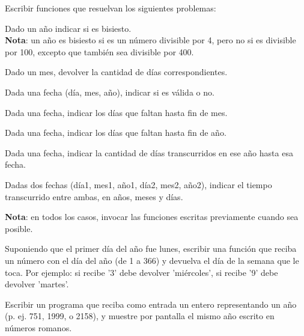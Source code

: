 \begin{ejercicio} Escribir funciones que resuelvan los siguientes problemas:
\begin{partes}
    \item Dado un año indicar si es bisiesto. \\
{\bf Nota}: un año es bisiesto si es un número divisible por 4, pero no si es
divisible por 100, excepto que también sea divisible por 400.

    \item Dado un mes, devolver la cantidad de días correspondientes.

    \item Dada una fecha (día, mes, año), indicar si es válida o no.

    \item Dada una fecha, indicar los días que faltan hasta fin de mes.

    \item Dada una fecha, indicar los días que faltan hasta fin de año.

    \item Dada una fecha, indicar la cantidad de días transcurridos en ese año
hasta esa fecha.

    \item Dadas dos fechas (día1, mes1, año1, día2, mes2, año2), indicar el
tiempo transcurrido entre ambas, en años, meses y días.
\end{partes}
{\bf Nota}: en todos los casos, invocar las funciones escritas previamente
cuando sea posible.
\end{ejercicio}


\begin{ejercicio}
Suponiendo que el primer día del año fue lunes, escribir una función
que reciba un número con el día del año (de 1 a 366) y devuelva el día
de la semana que le toca. Por ejemplo: si recibe '3' debe devolver
'miércoles', si recibe '9' debe devolver 'martes'.
\end{ejercicio}


\begin{ejercicio}
Escribir un programa que reciba como entrada un entero representando un año
(p. ej. 751, 1999, o 2158), y muestre por pantalla el mismo año escrito en
números romanos.
\end{ejercicio}


